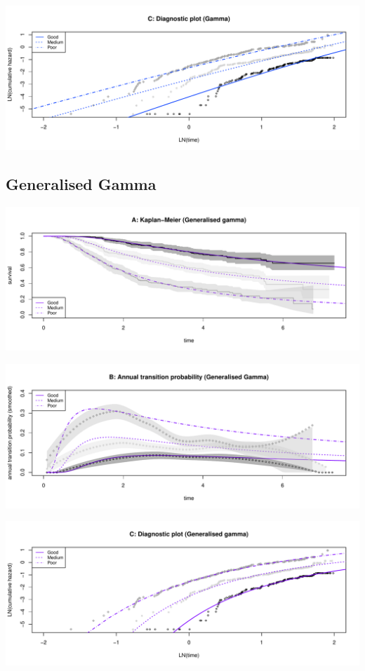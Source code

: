 \documentclass[]{article}
\begin{document}
\begin{flushleft}\includegraphics[height=0.3\textheight]{images/gam-3} \end{flushleft}

\subsection{Generalised Gamma}\label{generalised-gamma}

\begin{flushleft}\includegraphics[height=0.3\textheight]{images/ggam-1} \end{flushleft}

\begin{flushleft}\includegraphics[height=0.3\textheight]{images/ggam-2} \end{flushleft}

\begin{flushleft}\includegraphics[height=0.3\textheight]{images/ggam-3} \end{flushleft}
\end{document}
